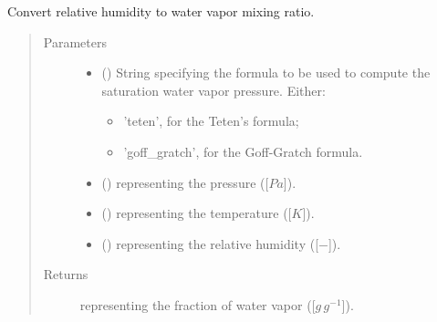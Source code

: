 \documentclass[letterpaper,10pt,english]{sphinxmanual}
\begin{document}
\begin{fulllineitems}
\label{\detokenize{api:utils.utils_meteo.convert_relative_humidity_to_water_vapor}}
Convert relative humidity to water vapor mixing ratio.
\begin{quote}\begin{description}
\item[{Parameters}] \leavevmode\begin{itemize}
\item {} 
 () \textendash{} 
String specifying the formula to be used to compute the saturation water vapor pressure. Either:
\begin{itemize}
\item {} 
’teten’, for the Teten’s formula;

\item {} 
’goff\_gratch’, for the Goff-Gratch formula.

\end{itemize}


\item {} 
 () \textendash{}  representing the pressure ({[}\(Pa\){]}).

\item {} 
 () \textendash{}  representing the temperature ({[}\(K\){]}).

\item {} 
 () \textendash{}  representing the relative humidity ({[}\(-\){]}).

\end{itemize}

\item[{Returns}] \leavevmode
{} representing the fraction of water vapor ({[}\(g \, g^{-1}\){]}).


\end{description}
\end{quote}
\end{fulllineitems}
\end{document}
